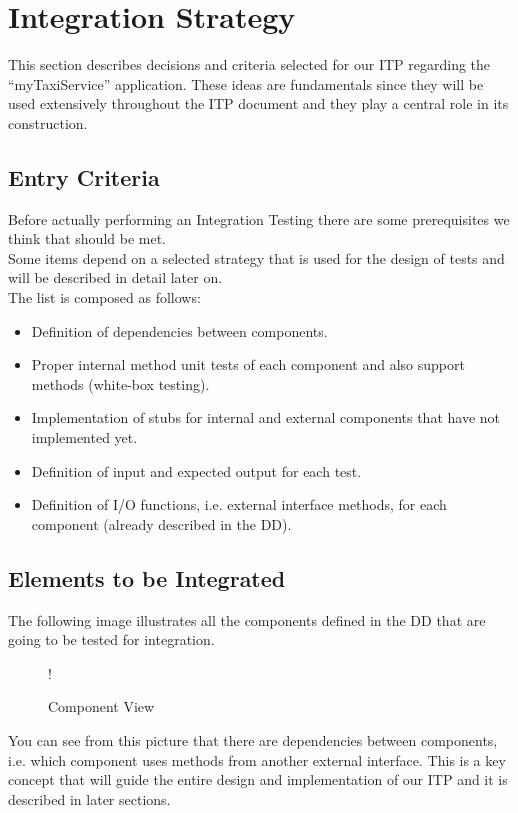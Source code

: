 \break
\section{Integration Strategy}
This section describes decisions and criteria selected for our ITP regarding the ``myTaxiService'' application. These ideas are fundamentals since they will be used extensively throughout the ITP document and they play a central role in its construction.
\subsection{Entry Criteria}
Before actually performing an Integration Testing there are some prerequisites we think that should be met. \\ Some items depend on a selected strategy that is used for the design of tests and will be described in detail later on. \\
The list is composed as follows:
\begin{itemize}
	\item Definition of dependencies between components.
	\item Proper internal method unit tests of each component and also support methods (white-box testing).
	\item Implementation of stubs for internal and external components that have not implemented yet.
	\item Definition of input and expected output for each test.
	\item Definition of I/O functions, i.e. external interface methods, for each component (already described in the DD).
\end{itemize} 
\break
\subsection{Elements to be Integrated}
The following image illustrates all the components defined in the DD that are going to be tested for integration.
\begin{figure}[H]
	\centering
	\resizebox{6in}
	{!}{}
	\label{Figure 1:}\caption{Component View}
\end{figure}
You can see from this picture that there are dependencies between components, i.e. which component uses methods from another external interface. This is a key concept that will guide the entire design and implementation of our ITP and it is described in later sections.
